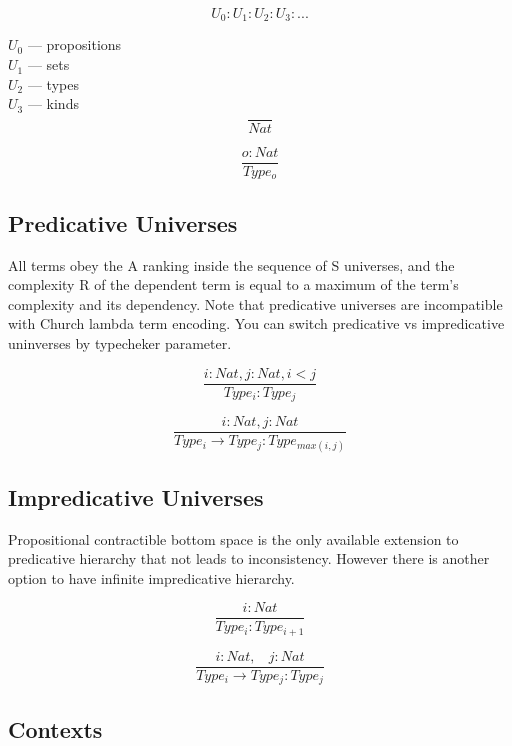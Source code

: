 \documentclass[11pt,oneside]{article}
\begin{document}
$$
U_0 : U_1 : U_2 : U_3 : ...
$$

$U_0$ --- propositions\\
$U_1$ --- sets\\
$U_2$ --- types\\
$U_3$ --- kinds\\

\begin{equation}
\tag{I}
\dfrac
{}
{Nat}
\end{equation}

\begin{equation}
\tag{S}
\dfrac
{o : Nat}
{Type_o}
\end{equation}

\subsection{Predicative Universes}

All terms obey the A ranking inside the sequence of S universes,
and the complexity R of the dependent term is equal to a maximum of
the term's complexity and its dependency.
Note that predicative universes are incompatible with Church lambda term encoding.
You can switch predicative vs impredicative uninverses by typecheker parameter.

\[
\tag{$A_1$}
\dfrac{i: Nat, j: Nat, i < j}{Type_i : Type_j}
\]

\[
\tag{$R_1$}
\dfrac{i : Nat, j : Nat}{Type_i \rightarrow Type_j : Type_{max(i,j)} }
\]

\subsection{Impredicative Universes}
Propositional contractible bottom space is the only
available extension to predicative hierarchy that not leads to inconsistency.
However there is another option to have infinite
impredicative hierarchy.

\begin{equation}
\tag{$A_2$}
\dfrac
{i: Nat}
{Type_i : Type_{i+1}}
\end{equation}

\begin{equation}
\tag{$R_2$}
\dfrac
{i : Nat,\ \ \ \ j : Nat}
{Type_i \rightarrow Type_{j} : Type_{j}}
\end{equation}

\subsection{Contexts}
\end{document}
